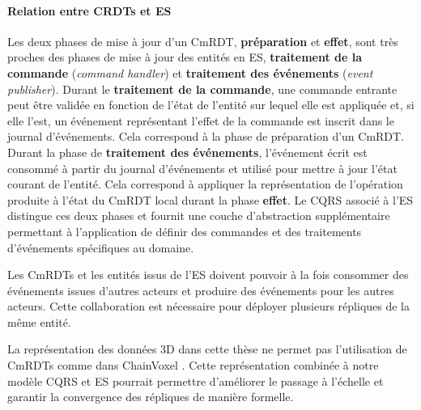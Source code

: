 \paragraph{Relation entre \glspl{CRDT} et \acrlong{ES}}
Les deux phases de mise à jour d'un CmRDT, \textbf{préparation} et \textbf{effet}, 
sont très proches des phases de mise à jour des entités en \gls{ES}, 
\textbf{traitement de 
la commande }(\textit{command handler}) et \textbf{traitement des événements} 
(\textit{event 
publisher}). 
Durant le \textbf{traitement de la commande}, une commande entrante peut être 
validée en fonction de l'état de l'entité sur lequel elle est appliquée et, si elle l'est, 
un événement représentant l'effet de la commande est inscrit dans le journal 
d'événements. Cela correspond à la phase de préparation d'un CmRDT. 
Durant la 
phase de \textbf{traitement des événements}, l'événement écrit est consommé à 
partir du journal d'événements et utilisé pour mettre à jour l'état courant de l'entité. 
Cela correspond à appliquer la représentation de l'opération produite à l'état du 
CmRDT local durant la phase \textbf{effet}. Le \gls{CQRS} associé à l'\gls{ES} 
distingue ces deux phases et fournit une couche d'abstraction supplémentaire 
permettant à l'application de définir des 
commandes et des traitements d'événements spécifiques au domaine.

Les CmRDTs et les entités issus de l'\gls{ES} doivent pouvoir à la fois 
consommer des événements issues d'autres acteurs et produire des événements 
pour les autres acteurs. Cette collaboration est nécessaire pour déployer plusieurs 
répliques de la même entité. 

La représentation des données 3D dans cette thèse ne permet pas l'utilisation de 
CmRDTs comme dans ChainVoxel \cite{Imae2016}. Cette représentation 
combinée à notre modèle \gls{CQRS} et \gls{ES} pourrait permettre d'améliorer le 
passage à l'échelle et garantir la convergence des répliques de manière formelle.
%




